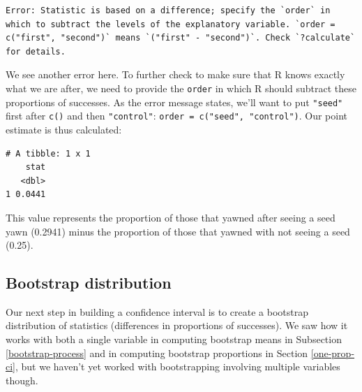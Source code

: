 \documentclass[12pt,]{krantz}
\makeatletter
\newenvironment{Shaded}{\begin{snugshade}}{\end{snugshade}}
\newcommand{\KeywordTok}[1]{\textcolor[rgb]{0.27,0.27,0.27}{\textbf{#1}}}
\newcommand{\DataTypeTok}[1]{\textcolor[rgb]{0.27,0.27,0.27}{#1}}
\newcommand{\StringTok}[1]{\textcolor[rgb]{0.5,0.5,0.5}{#1}}
\newcommand{\OperatorTok}[1]{\textcolor[rgb]{0.43,0.43,0.43}{\textbf{#1}}}
\newcommand{\NormalTok}[1]{#1}
\newenvironment{kframe}{%
\medskip{}
\setlength{\fboxsep}{.8em}
 \def\at@end@of@kframe{}%
 \ifinner\ifhmode%
  \def\at@end@of@kframe{\end{minipage}}%
  \begin{minipage}{\columnwidth}%
 \fi\fi%
 \def\FrameCommand##1{\hskip\@totalleftmargin \hskip-\fboxsep
 \colorbox{shadecolor}{##1}\hskip-\fboxsep
     \hskip-\linewidth \hskip-\@totalleftmargin \hskip\columnwidth}%
 \MakeFramed {\advance\hsize-\width
   \@totalleftmargin\z@ \linewidth\hsize
   \@setminipage}}%
 {\par\unskip\endMakeFramed%
 \at@end@of@kframe}
\renewenvironment{Shaded}{\begin{kframe}}{\end{kframe}}
\makeatother
\begin{document}
\begin{verbatim}
Error: Statistic is based on a difference; specify the `order` in which to subtract the levels of the explanatory variable. `order = c("first", "second")` means `("first" - "second")`. Check `?calculate` for details.
\end{verbatim}

We see another error here. To further check to make sure that R knows
exactly what we are after, we need to provide the \texttt{order} in
which R should subtract these proportions of successes. As the error
message states, we'll want to put \texttt{"seed"} first after
\texttt{c()} and then \texttt{"control"}:
\texttt{order\ =\ c("seed",\ "control")}. Our point estimate is thus
calculated:

\begin{Shaded}
\end{Shaded}

\begin{verbatim}
# A tibble: 1 x 1
    stat
   <dbl>
1 0.0441
\end{verbatim}

This value represents the proportion of those that yawned after seeing a
seed yawn (0.2941) minus the proportion of those that yawned with not
seeing a seed (0.25).

\subsection{Bootstrap distribution}\label{bootstrap-distribution-2}

Our next step in building a confidence interval is to create a bootstrap
distribution of statistics (differences in proportions of successes). We
saw how it works with both a single variable in computing bootstrap
means in Subsection \ref{bootstrap-process} and in computing bootstrap
proportions in Section \ref{one-prop-ci}, but we haven't yet worked with
bootstrapping involving multiple variables though.
\end{document}

